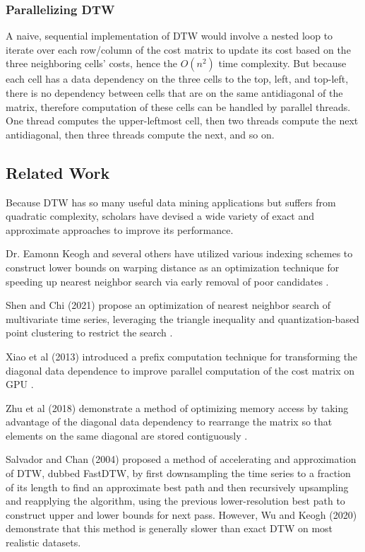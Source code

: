 \documentclass[12pt, letterpaper]{article}
\begin{document}
\subsubsection{Parallelizing DTW}

A naive, sequential implementation of DTW would involve a nested loop to iterate
over each row/column of the cost matrix to update its cost based on the three
neighboring cells' costs, hence the $O(n^2)$ time complexity. But because each
cell has a data dependency on the three cells to the top, left, and top-left,
there is no dependency between cells that are on the same antidiagonal of
the matrix, therefore computation of these cells can be handled by parallel
threads. One thread computes the upper-leftmost cell, then two threads compute
the next antidiagonal, then three threads compute the next, and so on.

\subsection{Related Work}

Because DTW has so many useful data mining applications but suffers from
quadratic complexity, scholars have devised a wide variety of exact and
approximate approaches to improve its performance.

Dr. Eamonn Keogh and several others have utilized various indexing schemes to
construct lower bounds on warping distance as an optimization technique for
speeding up nearest neighbor search via early removal of poor candidates
\cite{keogh_exact_2002}.

Shen and Chi (2021) propose an optimization of nearest neighbor search of
multivariate time series, leveraging the triangle inequality and
quantization-based point clustering to restrict the search
\cite{shen_tc-dtw_2021}.

Xiao et al (2013) introduced a prefix computation technique for transforming the
diagonal data dependence to improve parallel computation of the cost matrix on
GPU \cite{xiao_parallelizing_2013}.

Zhu et al (2018) demonstrate a method of optimizing memory access by taking
advantage of the diagonal data dependency to rearrange the matrix so that
elements on the same diagonal are stored contiguously
\cite{zhu_developing_2018}.

Salvador and Chan (2004) \cite{salvador_fastdtw_2004} proposed a method of
accelerating and approximation of DTW, dubbed FastDTW, by first downsampling the
time series to a fraction of its length to find an approximate best path and
then recursively upsampling and reapplying the algorithm, using the previous
lower-resolution best path to construct upper and lower bounds for next
pass. However, Wu and Keogh (2020) demonstrate that this method is generally
slower than exact DTW on most realistic datasets.
\end{document}

